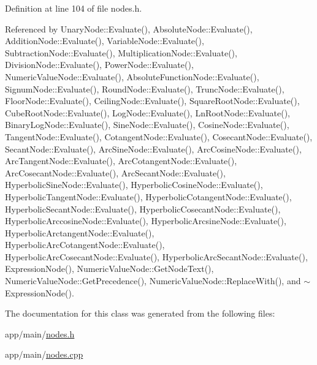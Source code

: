Definition at line 104 of file nodes.\+h.



Referenced by Unary\+Node\+::\+Evaluate(), Absolute\+Node\+::\+Evaluate(), Addition\+Node\+::\+Evaluate(), Variable\+Node\+::\+Evaluate(), Subtraction\+Node\+::\+Evaluate(), Multiplication\+Node\+::\+Evaluate(), Division\+Node\+::\+Evaluate(), Power\+Node\+::\+Evaluate(), Numeric\+Value\+Node\+::\+Evaluate(), Absolute\+Function\+Node\+::\+Evaluate(), Signum\+Node\+::\+Evaluate(), Round\+Node\+::\+Evaluate(), Trunc\+Node\+::\+Evaluate(), Floor\+Node\+::\+Evaluate(), Ceiling\+Node\+::\+Evaluate(), Square\+Root\+Node\+::\+Evaluate(), Cube\+Root\+Node\+::\+Evaluate(), Log\+Node\+::\+Evaluate(), Ln\+Root\+Node\+::\+Evaluate(), Binary\+Log\+Node\+::\+Evaluate(), Sine\+Node\+::\+Evaluate(), Cosine\+Node\+::\+Evaluate(), Tangent\+Node\+::\+Evaluate(), Cotangent\+Node\+::\+Evaluate(), Cosecant\+Node\+::\+Evaluate(), Secant\+Node\+::\+Evaluate(), Arc\+Sine\+Node\+::\+Evaluate(), Arc\+Cosine\+Node\+::\+Evaluate(), Arc\+Tangent\+Node\+::\+Evaluate(), Arc\+Cotangent\+Node\+::\+Evaluate(), Arc\+Cosecant\+Node\+::\+Evaluate(), Arc\+Secant\+Node\+::\+Evaluate(), Hyperbolic\+Sine\+Node\+::\+Evaluate(), Hyperbolic\+Cosine\+Node\+::\+Evaluate(), Hyperbolic\+Tangent\+Node\+::\+Evaluate(), Hyperbolic\+Cotangent\+Node\+::\+Evaluate(), Hyperbolic\+Secant\+Node\+::\+Evaluate(), Hyperbolic\+Cosecant\+Node\+::\+Evaluate(), Hyperbolic\+Arccosine\+Node\+::\+Evaluate(), Hyperbolic\+Arcsine\+Node\+::\+Evaluate(), Hyperbolic\+Arctangent\+Node\+::\+Evaluate(), Hyperbolic\+Arc\+Cotangent\+Node\+::\+Evaluate(), Hyperbolic\+Arc\+Cosecant\+Node\+::\+Evaluate(), Hyperbolic\+Arc\+Secant\+Node\+::\+Evaluate(), Expression\+Node(), Numeric\+Value\+Node\+::\+Get\+Node\+Text(), Numeric\+Value\+Node\+::\+Get\+Precedence(), Numeric\+Value\+Node\+::\+Replace\+With(), and $\sim$\+Expression\+Node().



The documentation for this class was generated from the following files\+:\begin{DoxyCompactItemize}
\item 
app/main/\hyperlink{nodes_8h}{nodes.\+h}\item 
app/main/\hyperlink{nodes_8cpp}{nodes.\+cpp}\end{DoxyCompactItemize}
